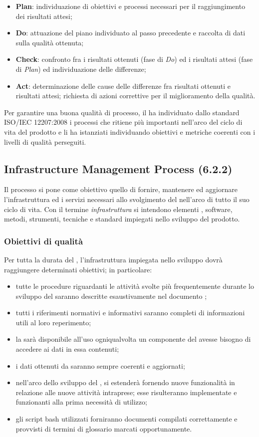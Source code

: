 \begin{itemize}
\item \textbf{Plan}: individuazione di obiettivi e processi necessari per il raggiungimento dei risultati attesi;
\item \textbf{Do}: attuazione del piano individuato al passo precedente e raccolta di dati sulla qualità ottenuta;
\item \textbf{Check}: confronto fra i risultati ottenuti (fase di \textit{Do}) ed i risultati attesi (fase di \textit{Plan}) ed individuazione delle differenze;
\item \textbf{Act}: determinazione delle cause delle differenze fra risultati ottenuti e risultati attesi; richiesta di azioni correttive per il miglioramento della qualità.
\end{itemize}
Per garantire una buona qualità di processo, il  ha individuato dallo standard ISO/IEC 12207:2008 i processi che ritiene più importanti nell'arco del ciclo di vita del prodotto e li ha istanziati individuando obiettivi e metriche coerenti con i livelli di qualità perseguiti.
\subsection{Infrastructure Management Process (6.2.2)}
\label{infraMgmt}
Il processo si pone come obiettivo quello di fornire, mantenere ed aggiornare l'infrastruttura ed i servizi necessari allo svolgimento del  nell'arco di tutto il suo ciclo di vita. Con il termine \textit{infrastruttura} si intendono elementi , software, metodi, strumenti, tecniche e standard impiegati nello sviluppo del prodotto.
\subsubsection{Obiettivi di qualità}
Per tutta la durata del , l'infrastruttura impiegata nello sviluppo dovrà raggiungere determinati obiettivi; in particolare:
\begin{itemize}
\item tutte le procedure riguardanti le attività svolte più frequentemente durante lo sviluppo del  saranno descritte esaustivamente nel documento \NP;
\item tutti i riferimenti normativi e informativi saranno completi di informazioni utili al loro reperimento;
\item la  \pragmadb sarà disponibile all'uso ogniqualvolta un componente del  avesse bisogno di accedere ai dati in essa contenuti;
\item i dati ottenuti da \pragmadb saranno sempre coerenti e aggiornati;
\item nell'arco dello sviluppo del , \pragmadb si estenderà fornendo nuove funzionalità in relazione alle nuove attività intraprese; esse risulteranno implementate e funzionanti alla prima necessità di utilizzo;
\item gli script bash utilizzati forniranno documenti compilati correttamente e provvisti di termini di glossario marcati opportunamente.
\end{itemize}
